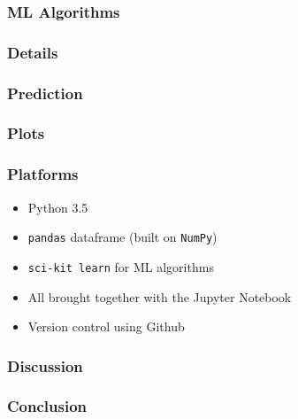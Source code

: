 \documentclass{beamer}
\let\olditem=\item
\renewcommand{\item}{\olditem \justifying}
\begin{document}
\frame %
{
  \frametitle{ML Algorithms}
  
}

\frame %
{
  \frametitle{Details}
  
}
  
  
  
\frame %
{
  \frametitle{Prediction}
  
}

\frame %
{
  \frametitle{Plots}
  
}



\frame %
{
  \frametitle{Platforms}
  \begin{itemize}
  \item Python 3.5
  \item \texttt{pandas} dataframe (built on \texttt{NumPy})
  \item \texttt{sci-kit learn} for ML algorithms
  \item All brought together with the Jupyter Notebook
  \item Version control using Github
  \end{itemize}
}

\frame %
{
  \frametitle{Discussion}

}

\frame %
{
  \frametitle{Conclusion}

}
\end{document}
